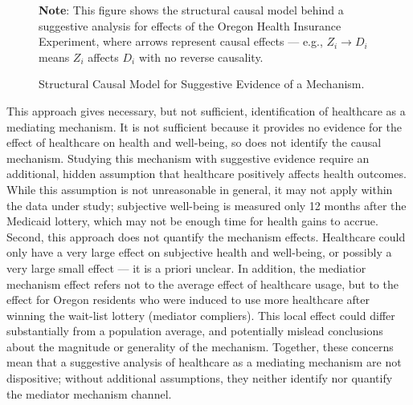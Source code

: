 \begin{figure}[!h]
    \centering
    \singlespacing
    \caption{Structural Causal Model for Suggestive Evidence of a Mechanism.}
    \label{fig:scm-health}
    \justify
    \footnotesize
    \textbf{Note}:
    This figure shows the structural causal model behind a suggestive analysis for effects of the Oregon Health Insurance Experiment, where arrows represent causal effects --- e.g., $Z_i \to D_i$ means $Z_i$ affects $D_i$ with no reverse causality.
\end{figure}

This approach gives necessary, but not sufficient, identification of healthcare as a mediating mechanism.
It is not sufficient because it provides no evidence for the effect of healthcare on health and well-being, so does not identify the causal mechanism.
Studying this mechanism with suggestive evidence require an additional, hidden assumption that healthcare positively affects health outcomes.
While this assumption is not unreasonable in general, it may not apply within the data under study; subjective well-being is measured only 12 months after the Medicaid lottery, which may not be enough time for health gains to accrue.
Second, this approach does not quantify the mechanism effects.
Healthcare could only have a very large effect on subjective health and well-being, or possibly a very large small effect --- it is a priori unclear.
In addition, the mediatior mechanism effect refers not to the average effect of healthcare usage, but to the effect for Oregon residents who were induced to use more healthcare after winning the wait-list lottery (mediator compliers).
This local effect could differ substantially from a population average, and potentially mislead conclusions about the magnitude or generality of the mechanism.
Together, these concerns mean that a suggestive analysis of healthcare as a mediating mechanism are not dispositive; without additional assumptions, they neither identify nor quantify the mediator mechanism channel.

